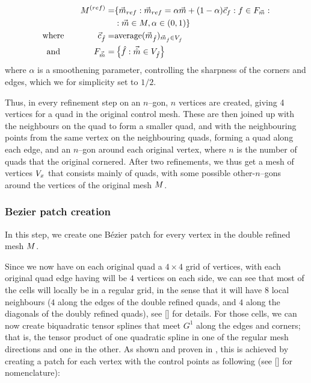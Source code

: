 \begin{align}
\petersControlMesh^{(ref)} =& \lbrace \petersControlMeshVec_{ref} \suchthat\petersControlMeshVec_{ref} = \alpha\petersControlMeshVec + (1-\alpha)\centroidof{f} \suchthat f \in \facesof{\petersControlMeshVec} \suchthat
\\ \notag &
 \suchthat \petersControlMeshVec \in \petersControlMesh, \alpha \in (0,1) \rbrace
\\
\where \qquad\qquad \centroidof{\hat{f}} =& \text{average}(\petersControlMeshVec_{\hat{f}})_{\petersControlMeshVec_{\hat{f}} \in \verticesof{\hat{f}}}
\\
\text{and} \qquad\qquad F_{\vec{\hat{m}}} =& \left\lbrace \hat{f} \suchthat \vec{\hat{m}} \in \verticesof{\hat{f}}	\right\rbrace
\end{align}
where $\alpha$ is a smoothening parameter, controlling the sharpness of the corners and edges, which we for simplicity set to $1/2$.

Thus, in every refinement step on an $n$--gon, $n$ vertices are created, giving 4 vertices for a quad in the original control mesh. These are then joined up with the neighbours on the quad to form a smaller quad, and with the neighbouring points from the same vertex on the neighbouring quads, forming a quad along each edge, and an $n$--gon around each original vertex, where $n$ is the number of quads that the original cornered. After two refinements, we thus get a mesh of vertices $\petersPatchPoints$ that consists mainly of quads, with some possible other-$n$--gons around the vertices of the original mesh $\petersControlMesh$. 

\subsubsection{Bezier patch creation}
In this step, we create one B{\'e}zier patch for every vertex in the double refined mesh $\petersControlMesh$. 

Since we now have on each original quad a $4 \times 4$ grid of vertices, with each original quad edge having will be $4$ vertices on each side, we can see that most of the cells will locally be in a regular grid, in the sense that it will have $8$ local neighbours ($4$ along the edges of the double refined quads, and $4$ along the diagonals of the doubly refined quads), see [] for details. 
For those cells, we can now create biquadratic tensor splines that meet $G^1$ along the edges and corners; that is, the tensor product of one quadratic spline in one of the regular mesh directions and one in the other. As shown and proven in \cite{peters1992constructing}, this is achieved by creating a \Bez patch for each vertex with the \Bez control points as following (see [] for nomenclature):

